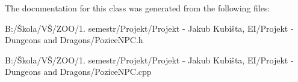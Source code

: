 The documentation for this class was generated from the following files\-:\begin{DoxyCompactItemize}
\item 
B\-:/Škola/\-VŠ/\-Z\-O\-O/1. semestr/\-Projekt/\-Projekt -\/ Jakub Kubišta, E\-I/\-Projekt -\/ Dungeons and Dragons/Pozice\-N\-P\-C.\-h\item 
B\-:/Škola/\-VŠ/\-Z\-O\-O/1. semestr/\-Projekt/\-Projekt -\/ Jakub Kubišta, E\-I/\-Projekt -\/ Dungeons and Dragons/Pozice\-N\-P\-C.\-cpp\end{DoxyCompactItemize}
